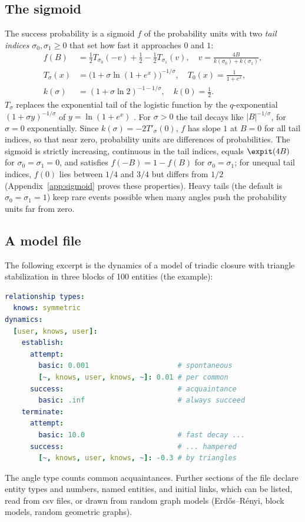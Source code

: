 \subsection{The sigmoid}
The success probability is a sigmoid $f$ of the probability units with two \emph{tail indices} $\sigma_0, \sigma_1 \ge 0$ that set how fast it approaches $0$ and $1$:
\begin{equation}\label{eq:sigmoid}
\begin{aligned}
  f(B) &= \tfrac12 T_{\sigma_0}(-v) + \tfrac12 - \tfrac12 T_{\sigma_1}(v), \quad
  v = \frac{4B}{k(\sigma_0) + k(\sigma_1)}, \\
  T_\sigma(x) &= \bigl(1 + \sigma \ln(1 + e^{x})\bigr)^{-1/\sigma}, \quad T_0(x) = \frac{1}{1+e^{x}}, \\
  k(\sigma) &= (1 + \sigma\ln 2)^{-1-1/\sigma}, \quad k(0) = \tfrac12.
\end{aligned}
\end{equation}
$T_\sigma$ replaces the exponential tail of the logistic function by the $q$-exponential $(1 + \sigma y)^{-1/\sigma}$ of $y = \ln(1+e^{x})$ \citep{tsallis1988}.
For $\sigma > 0$ the tail decays like $|B|^{-1/\sigma}$, for $\sigma = 0$ exponentially.
Since $k(\sigma) = -2T'_\sigma(0)$, $f$ has slope $1$ at $B = 0$ for all tail indices, so that near zero, probability units are differences of probabilities.
The sigmoid is strictly increasing, continuous in the tail indices, equals $\expit(4B)$ for $\sigma_0 = \sigma_1 = 0$, and satisfies $f(-B) = 1 - f(B)$ for $\sigma_0 = \sigma_1$; for unequal tail indices, $f(0)$ lies between $1/4$ and $3/4$ but differs from $1/2$ (Appendix~\ref{app:sigmoid} proves these properties).
Heavy tails (the default is $\sigma_0 = \sigma_1 = 1$) keep rare events possible when many angles push the probability units far from zero.

\subsection{A model file}
The following excerpt is the dynamics of a model of triadic closure with triangle stabilization in three blocks of 100 entities (the  example):
\begin{lstlisting}[language=yaml]
relationship types:
  knows: symmetric
dynamics:
  [user, knows, user]:
    establish:
      attempt:
        basic: 0.001                     # spontaneous
        [~, knows, user, knows, ~]: 0.01 # per common
      success:                           # acquaintance
        basic: .inf                      # always succeed
    terminate:
      attempt:
        basic: 10.0                      # fast decay ...
      success:                           # ... hampered
        [~, knows, user, knows, ~]: -0.3 # by triangles
\end{lstlisting}
\noindent The angle type  counts common acquaintances. Further
sections of the file declare entity types and numbers, named entities, and initial links, which can be listed, read from csv files, or drawn from random graph models (Erd\H{o}s--R\'enyi, block models, random geometric graphs).

